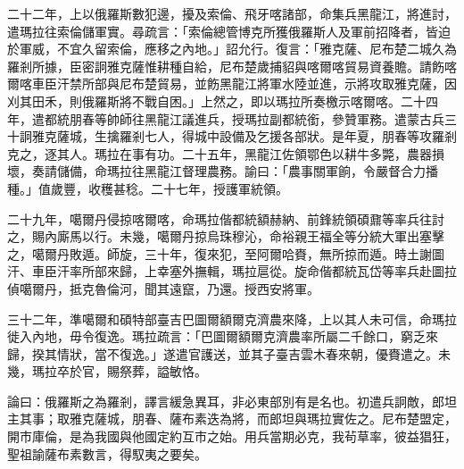 \begin{pinyinscope}
二十二年，上以俄羅斯數犯邊，擾及索倫、飛牙喀諸部，命集兵黑龍江，將進討，遣瑪拉往索倫儲軍實。尋疏言：「索倫總管博克所獲俄羅斯人及軍前招降者，皆迫於軍威，不宜久留索倫，應移之內地。」詔允行。復言：「雅克薩、尼布楚二城久為羅剎所據，臣密詗雅克薩惟耕種自給，尼布楚歲捕貂與喀爾喀貿易資養贍。請飭喀爾喀車臣汗禁所部與尼布楚貿易，並飭黑龍江將軍水陸並進，示將攻取雅克薩，因刈其田禾，則俄羅斯將不戰自困。」上然之，即以瑪拉所奏檄示喀爾喀。二十四年，遣都統朋春等帥師往黑龍江議進兵，授瑪拉副都統銜，參贊軍務。遣蒙古兵三十詗雅克薩城，生擒羅剎七人，得城中設備及乞援各部狀。是年夏，朋春等攻羅剎克之，逐其人。瑪拉在事有功。二十五年，黑龍江佐領鄂色以耕牛多斃，農器損壞，奏請儲備，命瑪拉往黑龍江督理農務。諭曰：「農事關軍餉，令嚴督合力播種。」值歲豐，收穫甚稔。二十七年，授護軍統領。

二十九年，噶爾丹侵掠喀爾喀，命瑪拉偕都統額赫納、前鋒統領碩鼐等率兵往討之，賜內廝馬以行。未幾，噶爾丹掠烏珠穆沁，命裕親王福全等分統大軍出塞擊之，噶爾丹敗遁。師旋，三十年，復來犯，至阿爾哈賚，無所掠而遁。時土謝圖汗、車臣汗率所部來歸，上幸塞外撫輯，瑪拉扈從。旋命偕都統瓦岱等率兵赴圖拉偵噶爾丹，抵克魯倫河，聞其遠竄，乃還。授西安將軍。

三十二年，準噶爾和碩特部臺吉巴圖爾額爾克濟農來降，上以其人未可信，命瑪拉徙入內地，毋令復逸。瑪拉疏言：「巴圖爾額爾克濟農率所屬二千餘口，窮乏來歸，揆其情狀，當不復逸。」遂遣官護送，並其子臺吉雲木春來朝，優賚遣之。未幾，瑪拉卒於官，賜祭葬，謚敏恪。

論曰：俄羅斯之為羅剎，譯言緩急異耳，非必東部別有是名也。初遣兵詗敵，郎坦主其事；取雅克薩城，朋春、薩布素迭為將，而郎坦與瑪拉實佐之。尼布楚盟定，開市庫倫，是為我國與他國定約互市之始。用兵當期必克，我茍草率，彼益猖狂，聖祖諭薩布素數言，得馭夷之要矣。


\end{pinyinscope}